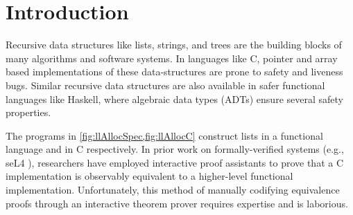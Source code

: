 \section{Introduction}
\label{sec:intro}

Recursive data structures like lists, strings, and trees
are the building blocks of many algorithms and
software systems. In languages
like C, pointer and array based
implementations of these data-structures
are prone to safety and liveness bugs.
Similar recursive data structures
are also available in safer functional languages
like Haskell, where
algebraic data types (ADTs) \cite{hope} ensure
several safety properties.



The programs
in \cref{fig:llAllocSpec,fig:llAllocC}
construct lists in a functional language and in C respectively.
In prior work on formally-verified systems (e.g., seL4 \cite{seL4}),
researchers have employed interactive proof assistants
to prove that a
C implementation is observably
equivalent to
a higher-level
functional implementation.
Unfortunately, this method
of manually codifying equivalence proofs
through an interactive theorem
prover requires expertise and is laborious.

